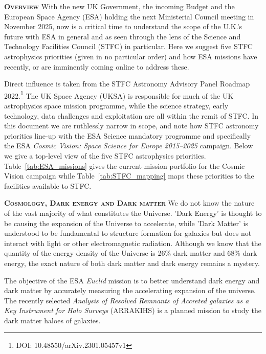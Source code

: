 \documentclass[a4paper,12pt]{texMemo}
\begin{document}
\maketitle

\vspace{-12pt}
{\bfseries \textsc{\textcolor{Cerulean}{Overview}}}
With the new UK Government, the incoming Budget and the European Space
Agency (ESA) holding the next Ministerial Council meeting in November
2025, now is a critical time to understand the scope of the U.K.'s
future with ESA in general and as seen through the lens of the Science
and Technology Facilities Council (STFC) in particular. Here we
suggest five STFC astrophysics priorities (given in no particular
order) and how ESA missions have recently, or are imminently coming
online to address these.

\smallskip
\smallskip
Direct influence is taken from the STFC Astronomy Advisory Panel
Roadmap 2022.\footnote{DOI: 10.48550/arXiv.2301.05457v1} The UK Space
Agency (UKSA) is responsible for much of the UK astrophysics space
mission programme, while the science strategy, early technology, data
challenges and exploitation are all within the remit of STFC.  In this
document we are ruthlessly narrow in scope, and note how STFC
astronomy priorities line-up with the ESA Science mandatory programme
and specifically the ESA \textit{Cosmic Vision: Space Science for
Europe 2015–2025} campaign.  Below we give a top-level view of the
five STFC astrophysics priorities.  Table~\ref{tab:ESA_missions} gives
the current mission portfolio for the Cosmic Vision campaign while
Table~\ref{tab:STFC_mapping} maps these priorities to the facilities
available to STFC.


\smallskip
\smallskip
{\bfseries \textsc{\textcolor{Cerulean}{Cosmology, Dark energy and Dark matter}}}
We do not know the nature of the vast majority of what constitutes the
Universe. 'Dark Energy' is thought to be causing the expansion of the
Universe to accelerate, while 'Dark Matter' is understood to be
fundamental to structure formation for galaxies but does not interact
with light or other electromagnetic radiation.  Although we know that
the quantity of the energy-density of the Universe is 26\% dark matter
and 68\% dark energy, the exact nature of both dark matter and dark
energy remains a mystery.

\smallskip
The objective of the ESA \textit{Euclid} mission is to better
understand dark energy and dark matter by accurately measuring the
accelerating expansion of the universe.  The recently selected
\textit{Analysis of Resolved Remnants of Accreted galaxies as a Key
Instrument for Halo Surveys} (ARRAKIHS) is a planned mission to study
the dark matter haloes of galaxies.
\end{document}
